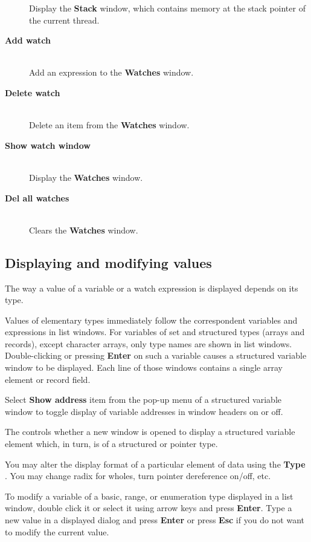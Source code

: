 \begin{description}
    Display the {\bf Stack} window, which contains memory at the stack
    pointer of the current thread.
\item[{\bf Add watch}] \mbox{} \\
    Add an expression to the {\bf Watches} window.
\item[{\bf Delete watch}] \mbox{} \\
    Delete an item from the {\bf Watches} window.
\item[{\bf Show watch window}] \mbox{} \\
    Display the {\bf Watches} window.
\item[{\bf Del all watches}] \mbox{} \\
    Clears the {\bf Watches} window.
\end{description}

\subsection{Displaying and modifying values}
\label{dialog:data:display}

The way a value of a variable or a watch expression is displayed
depends on its type.

Values of elementary types immediately follow
the correspondent variables and expressions in list windows.
For variables of set and structured types (arrays and records),
except character arrays, only type names are shown in list windows.
Double-clicking or pressing {\bf Enter} on such a variable causes a
structured variable window to be displayed.
Each line of those windows contains a single array element or record field.

Select {\bf Show address} item from the pop-up menu of a structured variable window
to toggle display of variable addresses in window headers on or off. 

The 
controls whether a new window is opened to display a structured
variable element which, in turn, is of a structured or pointer type.

You may alter the display format of a particular element of data using
the {\bf Type} . You may change radix
for wholes, turn pointer dereference on/off, etc.

To modify a variable of a basic, range, or enumeration type
displayed in a list window, double click it or select it using arrow
keys and press {\bf Enter}. Type a new value in a displayed dialog and
press {\bf Enter} or press {\bf Esc} if you do not want to modify the current value.

